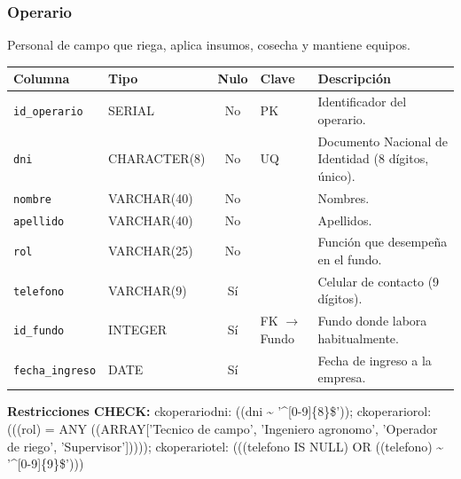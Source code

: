 \documentclass[11pt,letterpaper]{article}
\newcommand{\tbus}{\textunderscore\allowbreak}
\newcommand{\tb}[1]{{\ttfamily\let\_\tbus #1}}
\begin{document}
\subsubsection*{Operario}
Personal de campo que riega, aplica insumos, cosecha y mantiene equipos.
{\footnotesize
\begin{longtable}{>{\raggedright\arraybackslash}p{3.3cm}>{\raggedright\arraybackslash}p{2.5cm}c>{\raggedright\arraybackslash}p{2.2cm}>{\raggedright\arraybackslash}p{6.1cm}}
\toprule
\textbf{Columna} & \textbf{Tipo} & \textbf{Nulo} & \textbf{Clave} & \textbf{Descripción} \\
\midrule
\endhead
\texttt{id\_operario} & SERIAL & No & PK & Identificador del operario. \\
\texttt{dni} & CHARACTER(8) & No & UQ & Documento Nacional de Identidad (8 dígitos, único). \\
\texttt{nombre} & VARCHAR(40) & No &  & Nombres. \\
\texttt{apellido} & VARCHAR(40) & No &  & Apellidos. \\
\texttt{rol} & VARCHAR(25) & No &  & Función que desempeña en el fundo. \\
\texttt{telefono} & VARCHAR(9) & Sí &  & Celular de contacto (9 dígitos). \\
\texttt{id\_fundo} & INTEGER & Sí & FK $\to$ Fundo & Fundo donde labora habitualmente. \\
\texttt{fecha\_ingreso} & DATE & Sí &  & Fecha de ingreso a la empresa. \\
\bottomrule
\end{longtable}}
{\footnotesize\textbf{Restricciones CHECK:} \tb{ck\_operario\_dni}: \tb{((dni \textasciitilde{} '\textasciicircum{}[0-9]\{8\}\$'))}; \tb{ck\_operario\_rol}: \tb{(((rol) = ANY ((ARRAY['Tecnico de campo', 'Ingeniero agronomo', 'Operador de riego', 'Supervisor']))))}; \tb{ck\_operario\_tel}: \tb{(((telefono IS NULL) OR ((telefono) \textasciitilde{} '\textasciicircum{}[0-9]\{9\}\$')))}\par}
\medskip
\end{document}
